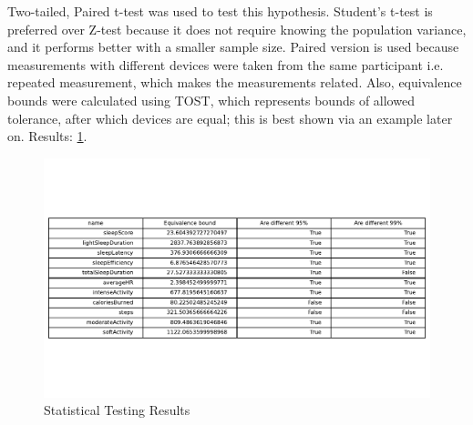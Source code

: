 Two-tailed, Paired t-test was used to test this hypothesis. Student's t-test is preferred over Z-test because it does not require knowing the population variance, and it performs better with a smaller sample size. Paired version is used because measurements with different devices were taken from the same participant i.e. repeated measurement, which makes the measurements related. Also, equivalence bounds were calculated using TOST, which represents bounds of allowed tolerance, after which devices are equal; this is best shown via an example later on. Results: \ref{fig:results}.

\begin{figure}
    
    \centering
    \includegraphics[width=\textwidth,keepaspectratio]{../images/results.pdf}
    \caption{Statistical Testing Results}
    \label{fig:results}
    
\end{figure}